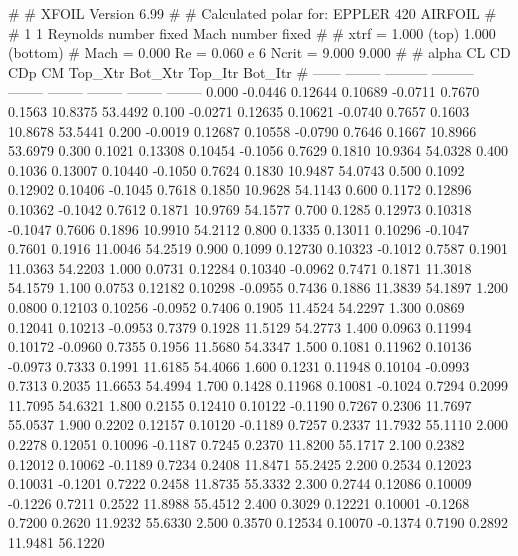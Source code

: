 #  
#       XFOIL         Version 6.99
#  
# Calculated polar for: EPPLER 420 AIRFOIL                              
#  
# 1 1 Reynolds number fixed          Mach number fixed         
#  
# xtrf =   1.000 (top)        1.000 (bottom)  
# Mach =   0.000     Re =     0.060 e 6     Ncrit =   9.000  9.000
#  
#   alpha    CL        CD       CDp       CM     Top_Xtr  Bot_Xtr  Top_Itr  Bot_Itr
#  ------ -------- --------- --------- -------- -------- -------- -------- --------
   0.000  -0.0446   0.12644   0.10689  -0.0711   0.7670   0.1563  10.8375  53.4492
   0.100  -0.0271   0.12635   0.10621  -0.0740   0.7657   0.1603  10.8678  53.5441
   0.200  -0.0019   0.12687   0.10558  -0.0790   0.7646   0.1667  10.8966  53.6979
   0.300   0.1021   0.13308   0.10454  -0.1056   0.7629   0.1810  10.9364  54.0328
   0.400   0.1036   0.13007   0.10440  -0.1050   0.7624   0.1830  10.9487  54.0743
   0.500   0.1092   0.12902   0.10406  -0.1045   0.7618   0.1850  10.9628  54.1143
   0.600   0.1172   0.12896   0.10362  -0.1042   0.7612   0.1871  10.9769  54.1577
   0.700   0.1285   0.12973   0.10318  -0.1047   0.7606   0.1896  10.9910  54.2112
   0.800   0.1335   0.13011   0.10296  -0.1047   0.7601   0.1916  11.0046  54.2519
   0.900   0.1099   0.12730   0.10323  -0.1012   0.7587   0.1901  11.0363  54.2203
   1.000   0.0731   0.12284   0.10340  -0.0962   0.7471   0.1871  11.3018  54.1579
   1.100   0.0753   0.12182   0.10298  -0.0955   0.7436   0.1886  11.3839  54.1897
   1.200   0.0800   0.12103   0.10256  -0.0952   0.7406   0.1905  11.4524  54.2297
   1.300   0.0869   0.12041   0.10213  -0.0953   0.7379   0.1928  11.5129  54.2773
   1.400   0.0963   0.11994   0.10172  -0.0960   0.7355   0.1956  11.5680  54.3347
   1.500   0.1081   0.11962   0.10136  -0.0973   0.7333   0.1991  11.6185  54.4066
   1.600   0.1231   0.11948   0.10104  -0.0993   0.7313   0.2035  11.6653  54.4994
   1.700   0.1428   0.11968   0.10081  -0.1024   0.7294   0.2099  11.7095  54.6321
   1.800   0.2155   0.12410   0.10122  -0.1190   0.7267   0.2306  11.7697  55.0537
   1.900   0.2202   0.12157   0.10120  -0.1189   0.7257   0.2337  11.7932  55.1110
   2.000   0.2278   0.12051   0.10096  -0.1187   0.7245   0.2370  11.8200  55.1717
   2.100   0.2382   0.12012   0.10062  -0.1189   0.7234   0.2408  11.8471  55.2425
   2.200   0.2534   0.12023   0.10031  -0.1201   0.7222   0.2458  11.8735  55.3332
   2.300   0.2744   0.12086   0.10009  -0.1226   0.7211   0.2522  11.8988  55.4512
   2.400   0.3029   0.12221   0.10001  -0.1268   0.7200   0.2620  11.9232  55.6330
   2.500   0.3570   0.12534   0.10070  -0.1374   0.7190   0.2892  11.9481  56.1220
